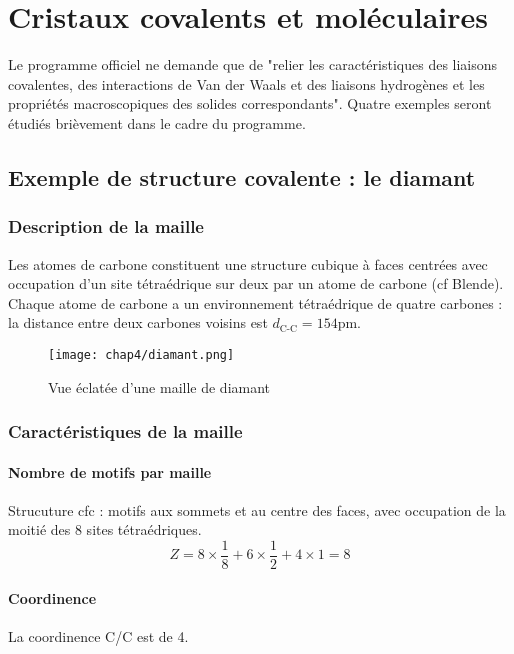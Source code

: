 \chapter{Cristaux covalents et moléculaires}
Le programme officiel ne demande que de "relier les caractéristiques des liaisons
covalentes, des interactions de Van der Waals et des liaisons hydrogènes et les
propriétés macroscopiques des solides correspondants". Quatre exemples seront étudiés
brièvement dans le cadre du programme.

\section{Exemple de structure covalente : le diamant }
\subsection{Description de la maille}
Les atomes de carbone constituent une structure cubique à faces centrées avec
occupation d’un site tétraédrique sur deux par un atome de carbone (cf Blende). Chaque
atome de carbone a un environnement tétraédrique de quatre carbones : la distance
entre deux carbones voisins est $d_\text{C-C} = 154$pm.

\begin{figure}
    \centering
    \texttt{[image: chap4/diamant.png]}
    \caption{Vue éclatée d'une maille de diamant}\label{fig:4_diamant_eclatee}
\end{figure}

\subsection{Caractéristiques de la maille}
\subsubsection{Nombre de motifs par maille}
Strucuture cfc : motifs aux sommets et au centre des faces, avec occupation de la
moitié des 8 sites tétraédriques.
\begin{equation}
    Z = 8 \times \frac{1}{8} + 6 \times \frac{1}{2} + 4 \times 1 = 8
\end{equation}

\subsubsection{Coordinence}
La coordinence C/C est de 4.

